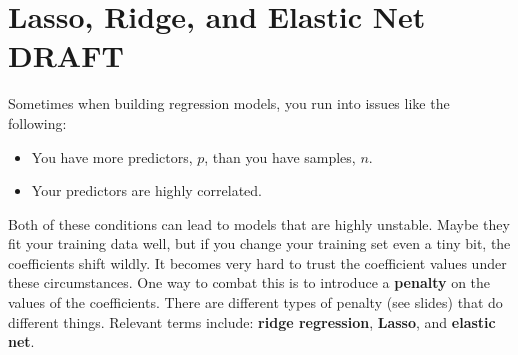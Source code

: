 \chapter{Lasso, Ridge, and Elastic Net {\color{red} DRAFT} \label{chapter:lassoridge}}

Sometimes when building regression models, you run into issues like the following:

\begin{itemize}
\item You have more predictors, $p$, than you have samples, $n$.
\item Your predictors are highly correlated.
\end{itemize}

Both of these conditions can lead to models that are highly unstable. Maybe they fit your training data well, but if you change your training set even a tiny bit, the coefficients shift wildly. It becomes very hard to trust the coefficient values under these circumstances. One way to combat this is to introduce a \textbf{penalty} on the values of the coefficients. There are different types of penalty (see slides) that do different things. Relevant terms include: \textbf{ridge regression}, \textbf{Lasso}, and \textbf{elastic net}.